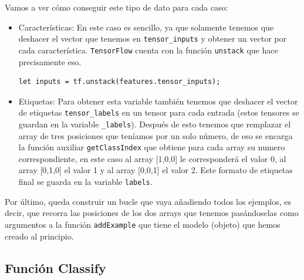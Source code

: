 \documentclass[a4paper, 12pt]{book}
\begin{document}
Vamos a ver cómo conseguir este tipo de dato para cada caso:

\begin{itemize}
	\item Características: En este caso es sencillo, ya que solamente tenemos que deshacer el vector que tenemos en \texttt{tensor\_inputs} y obtener un vector por cada característica. \texttt{TensorFlow} cuenta con la función \texttt{unstack} que hace precisamente eso.
\begin{verbatim}
let inputs = tf.unstack(features.tensor_inputs);
\end{verbatim}	
	\item Etiquetas: Para obtener esta variable también tenemos que deshacer el vector de etiquetas \texttt{tensor\_labels} en un tensor para cada entrada (estos tensores se guardan en la variable \texttt{\_labels}). Después de esto tenemos que remplazar el array de tres posiciones que teníamos por un solo número, de eso se encarga la función auxiliar \texttt{getClassIndex} que obtiene para cada array su numero correspondiente, en este caso al array [1,0,0] le corresponderá el valor 0, al array [0,1,0] el valor 1 y al array [0,0,1] el valor 2. Este formato de etiquetas final se guarda en la variable \texttt{labels}.
\end{itemize}

Por último, queda construir un bucle que vaya añadiendo todos los ejemplos, es decir, que recorra las posiciones de los dos arrays que tenemos pasándoselas como argumentos a la función \texttt{addExample} que tiene el modelo (objeto) que hemos creado al principio.

\subsection{Función Classify} 
\label{sec:funcionclassifyknn}
\end{document}
